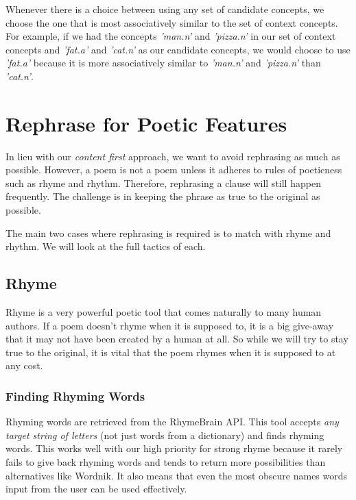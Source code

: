 Whenever there is a choice between using any set of candidate concepts, we choose the one that is most associatively similar to the set of context concepts. For example, if we had the concepts \textit{'man.n'} and \textit{'pizza.n'} in our set of context concepts and \textit{'fat.a'} and \textit{'cat.n'} as our candidate concepts, we would choose to use \textit{'fat.a'} because it is more associatively similar to \textit{'man.n'} and \textit{'pizza.n'} than \textit{'cat.n'}.


\section{Rephrase for Poetic Features}
\label{sec:rephrase}

In lieu with our \textit{content first} approach, we want to avoid rephrasing as much as possible. However, a poem is not a poem unless it adheres to rules of poeticness such as rhyme and rhythm. Therefore, rephrasing a clause will still happen frequently. The challenge is in keeping the phrase as true to the original as possible. 

The main two cases where rephrasing is required is to match with rhyme and rhythm. We will look at the full tactics of each.

\subsection{Rhyme}
Rhyme is a very powerful poetic tool that comes naturally to many human authors. If a poem doesn't rhyme when it is supposed to, it is a big give-away that it may not have been created by a human at all. So while we will try to stay true to the original, it is vital that the poem rhymes when it is supposed to at any cost.

\subsubsection{Finding Rhyming Words}
\label{sec:rhymebrain}
Rhyming words are retrieved from the RhymeBrain API\cite{rhymebrain}. This tool accepts \textit{any target string of letters} (not just words from a dictionary) and finds rhyming words. This works well with our high priority for strong rhyme because it rarely fails to give back rhyming words and tends to return more possibilities than alternatives like Wordnik\cite{wordnik}. It also means that even the most obscure names words input from the user can be used effectively.

